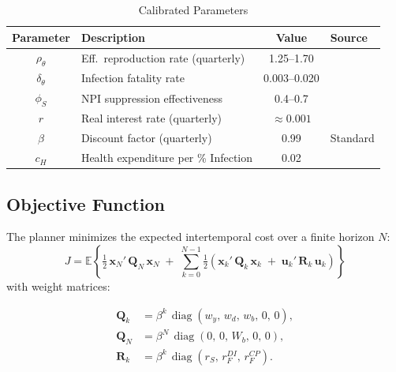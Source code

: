 \documentclass[12pt, a4paper]{article}
\begin{document}
\begin{table}[H]
\centering
\caption{Calibrated Parameters\protect\footnotemark}
\label{tab:calibration}
\scriptsize
\begin{tabular}{@{} c l c l @{}}
\toprule
\textbf{Parameter} & \textbf{Description} & \textbf{Value} & \textbf{Source} \\
\midrule
$\rho_\theta$ & Eff.\ reproduction rate (quarterly)
    & 1.25--1.70
    & \citet{dhungel2022, liu2021rocklov} \\
$\delta_\theta$ & Infection fatality rate
    & 0.003--0.020
    & \citet{IHME2022lancet, Levin2020} \\
$\phi_S$ & NPI suppression effectiveness
    & 0.4--0.7
    & \citet{brauner2021inferring, haug2020ranking} \\
$r$ & Real interest rate (quarterly)
    & $\approx 0.001$
    & \citet{OECD2022borrowing} \\
$\beta$ & Discount factor (quarterly)
    & 0.99
    & Standard \\
$c_H$ & Health expenditure per \% Infection
    & 0.02
    & \citet{imf2022fiscalmonitor, OECD2023health} \\
\bottomrule
\end{tabular}
\end{table}
 


\subsection{Objective Function}
\label{sec:objective}

The planner minimizes the expected intertemporal cost over a finite horizon $N$:
%
\begin{equation}
    J = \mathbb{E}\left\{\tfrac{1}{2}\,\bm{x}_N'\,\bm{Q}_N\,\bm{x}_N
    \;+\; \sum_{k=0}^{N-1}\tfrac{1}{2}\left(\bm{x}_k'\,\bm{Q}_k\,\bm{x}_k
    \;+\; \bm{u}_k'\,\bm{R}_k\,\bm{u}_k\right)\right\}
    \label{eq:objective1}
\end{equation}
%
with weight matrices:
%

\begin{equation}
\begin{aligned}
    \bm{Q}_k &= \beta^k\,\operatorname{diag}(w_y,\, w_d,\, w_b,\, 0,\, 0), \\
    \bm{Q}_N &= \beta^N\,\operatorname{diag}(0,\, 0,\, W_b,\, 0,\, 0), \\
    \bm{R}_k &= \beta^k\,\operatorname{diag}(r_S,\, r_F^{DI},\, r_F^{CP}).
\end{aligned}
\label{eq:weights}
\end{equation}
\end{document}
